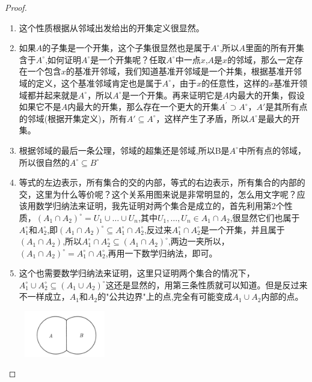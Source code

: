 \documentclass{article}
\begin{document}
\begin{proof}
\begin{enumerate}
	\item 这个性质根据从邻域出发给出的开集定义很显然。
	\item 如果$A$的子集是一个开集，这个子集很显然也是属于$A^{\circ}$,所以$A$里面的所有开集含于$A^{\circ}$,如何证明$A^{\circ}$是一个开集呢？任取$A^{\circ}$中一点$x$,$A$是$x$的邻域，那么一定存在一个包含$x$的基准开邻域，我们知道基准开邻域是一个并集，根据基准开邻域的定义，这个基准邻域肯定也是属于$A^{\circ}$，由于$x$的任意性，这样的$x$基准开领域都并起来就是$A^{\circ}$，所以$A^{\circ}$是一个开集。再来证明它是$A$内最大的开集，假设如果它不是$A$内最大的开集，那么存在一个更大的开集$A^{'} \supset A^{\circ}$，$A'$是其所有点的邻域(根据开集定义)，所有$A' \subseteq A^{\circ}$，这样产生了矛盾，所以$A^{\circ}$是最大的开集。
	\item 根据邻域的最后一条公理，邻域的超集还是邻域,所以B是$A^{\circ}$中所有点的邻域，所以很自然的$A^{\circ} \subseteq B^{\circ}$
	\item 等式的左边表示，所有集合的交的内部，等式的右边表示，所有集合的内部的交，这里为什么等价呢？这个关系用图来说是非常明显的，怎么用文字呢？应该用数学归纳法来证明，我先证明对两个集合是成立的，首先利用第2个性质，${(A_1 \cap A_2)}^{\circ}=U_1 \cup \ldots \cup U_n $,其中$U_1,\ldots,U_n \in A_1 \cap A_2$,很显然它们也属于$A_1^{\circ}$和$A_2^{\circ}$,即${(A_1 \cap A_2)}^{\circ} \subseteq A_1^{\circ} \cap A_2^{\circ}$,反过来$A_1^{\circ} \cap A_2^{\circ}$是一个开集，并且属于$(A_1 \cap A_2)$,所以$A_1^{\circ} \cap A_2^{\circ} \subseteq {(A_1 \cap A_2)}^{\circ}$,两边一夹所以，${(A_1 \cap A_2)}^{\circ} = A_1^{\circ} \cap A_2^{\circ}$,再用一下数学归纳法，即可。
	\item 这个也需要数学归纳法来证明，这里只证明两个集合的情况下，$A_1^{\circ} \cup A_2^{\circ} \subseteq {(A_1 \cup A_2)}^{\circ}$这还是显然的，用第三条性质就可以知道。但是反过来不一样成立，$A_1$和$A_2$的"公共边界"上的点,完全有可能变成$A_1 \cup A_2$内部的点。
	\begin{center}
		\includegraphics[width=4cm, height=2cm]{images/A_B_same_border.png}
	\end{center}	
\end{enumerate}
\end{proof}
\end{document}
